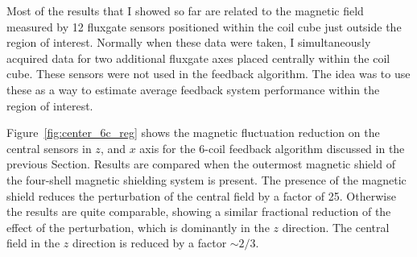 Most of the results that I showed so far are related to the magnetic field
measured by 12 fluxgate sensors positioned within the coil cube just
outside the region of interest.  Normally when these data were taken,
I simultaneously acquired data for two additional fluxgate axes placed
centrally within the coil cube.  These sensors were not used in the
feedback algorithm.  The idea was to use these as a way to estimate
average feedback system performance within the region of interest.


Figure~\ref{fig:center_6c_reg} shows the magnetic fluctuation
reduction on the central sensors in $z$, and $x$ axis for the 6-coil
feedback algorithm discussed in the previous Section.  Results are
compared when the outermost magnetic shield of the four-shell magnetic
shielding system is present.  The presence of the magnetic shield
reduces the perturbation of the central field by a factor of 25.
Otherwise the results are quite comparable, showing a similar
fractional reduction of the effect of the perturbation, which is
dominantly in the $z$ direction.  The central field in the $z$
direction is reduced by a factor $\sim 2/3$.





